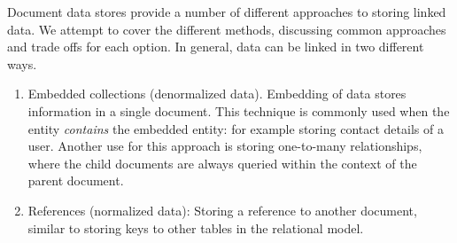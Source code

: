 







Document data stores provide a number of different approaches to storing linked data.
We attempt to cover the different methods, discussing common approaches and trade offs for each option.
In general, data can be linked in two different ways.

\begin{enumerate}
  \item Embedded collections (denormalized data).
        Embedding of data stores information in a single document.
        This technique is commonly used when the entity \textit{contains} the embedded entity: for example storing contact details of a user.
        Another use for this approach is storing one-to-many relationships, where the child documents are always queried within the context of the parent document.
  \item References (normalized data): Storing a reference to another document, similar to storing keys to other tables in the relational model.

\end{enumerate}

